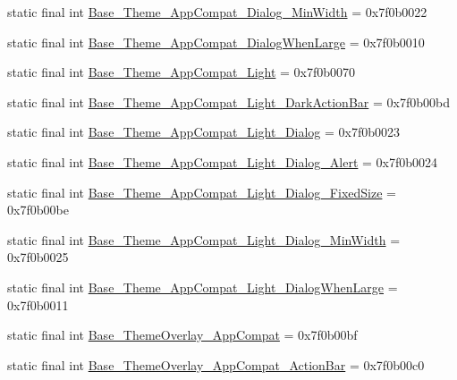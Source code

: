 \begin{CompactItemize}
\item 
static final int \hyperlink{classandroid_1_1support_1_1v7_1_1recyclerview_1_1_r_1_1style_ac78b2762e5ad0f30967684a35758642}{Base\_\-Theme\_\-AppCompat\_\-Dialog\_\-MinWidth} = 0x7f0b0022
\item 
static final int \hyperlink{classandroid_1_1support_1_1v7_1_1recyclerview_1_1_r_1_1style_7f6392e1dbabac9f397321d24ee81c7f}{Base\_\-Theme\_\-AppCompat\_\-DialogWhenLarge} = 0x7f0b0010
\item 
static final int \hyperlink{classandroid_1_1support_1_1v7_1_1recyclerview_1_1_r_1_1style_b7387cff53f4be1d0b7aa52c689c33dd}{Base\_\-Theme\_\-AppCompat\_\-Light} = 0x7f0b0070
\item 
static final int \hyperlink{classandroid_1_1support_1_1v7_1_1recyclerview_1_1_r_1_1style_94417547797afb8f2b12a1d10a7ff3b5}{Base\_\-Theme\_\-AppCompat\_\-Light\_\-DarkActionBar} = 0x7f0b00bd
\item 
static final int \hyperlink{classandroid_1_1support_1_1v7_1_1recyclerview_1_1_r_1_1style_5277953f56662f1af12c8c32e20a5b3f}{Base\_\-Theme\_\-AppCompat\_\-Light\_\-Dialog} = 0x7f0b0023
\item 
static final int \hyperlink{classandroid_1_1support_1_1v7_1_1recyclerview_1_1_r_1_1style_17a403975189f667b6835686bf1cfcd2}{Base\_\-Theme\_\-AppCompat\_\-Light\_\-Dialog\_\-Alert} = 0x7f0b0024
\item 
static final int \hyperlink{classandroid_1_1support_1_1v7_1_1recyclerview_1_1_r_1_1style_f8d2516311cd65a6b8c25d5492842b48}{Base\_\-Theme\_\-AppCompat\_\-Light\_\-Dialog\_\-FixedSize} = 0x7f0b00be
\item 
static final int \hyperlink{classandroid_1_1support_1_1v7_1_1recyclerview_1_1_r_1_1style_9410e4956214e10f82b3b4980abe0808}{Base\_\-Theme\_\-AppCompat\_\-Light\_\-Dialog\_\-MinWidth} = 0x7f0b0025
\item 
static final int \hyperlink{classandroid_1_1support_1_1v7_1_1recyclerview_1_1_r_1_1style_f8e861f40c606de65d0c4a6d20eebe95}{Base\_\-Theme\_\-AppCompat\_\-Light\_\-DialogWhenLarge} = 0x7f0b0011
\item 
static final int \hyperlink{classandroid_1_1support_1_1v7_1_1recyclerview_1_1_r_1_1style_6ac11e5dd4cced07d7f6913aeb968a38}{Base\_\-ThemeOverlay\_\-AppCompat} = 0x7f0b00bf
\item 
static final int \hyperlink{classandroid_1_1support_1_1v7_1_1recyclerview_1_1_r_1_1style_203bd9c3873faa454c150c049ee294ef}{Base\_\-ThemeOverlay\_\-AppCompat\_\-ActionBar} = 0x7f0b00c0
\item 

\end{CompactItemize}
